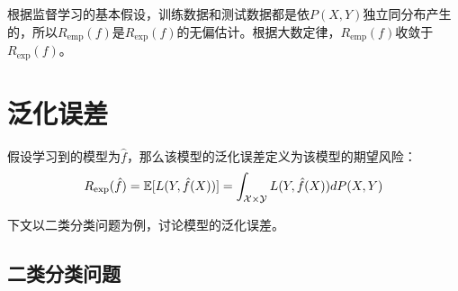 根据监督学习的基本假设，训练数据和测试数据都是依$P(X,Y)$独立同分布产生的，所以$R_{\operatorname{emp}}(f)$是$R_{\exp}(f)$的无偏估计。根据大数定律，$R_{\operatorname{emp}}(f)$收敛于$R_{\exp}(f)$。

\section{泛化误差}


假设学习到的模型为$\hat{f}$，那么该模型的泛化误差定义为该模型的期望风险：
\[
	R_{\exp}(\hat{f})	=\mathbb{E} [ L(Y,\hat{f}(X)) ] = \int_{{\mathcal{X}} \times {\mathcal{Y}}} L(Y,\hat{f}(X)) d P(X,Y)
\]

下文以二类分类问题为例，讨论模型的泛化误差。

\subsection{二类分类问题}


\clearpage
